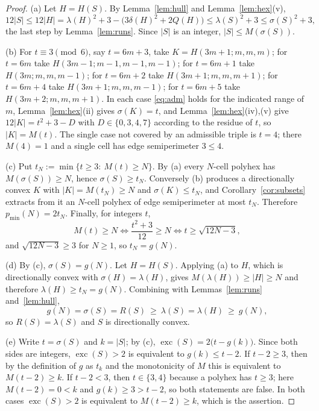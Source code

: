 \documentclass[11pt]{article}
\theoremstyle{plain}
\theoremstyle{definition}
\theoremstyle{remark}
\DeclareMathOperator{\exc}{exc}
\begin{document}
\begin{proof}
(a) Let \(H=H(S)\). By Lemma~\ref{lem:hull} and Lemma~\ref{lem:hex}(v),
\[
   12|S|\le12|H|=\lambda(H)^{2}+3-\bigl(3\delta(H)^{2}+2Q(H)\bigr)\le\lambda(S)^{2}+3
   \le\sigma(S)^{2}+3 ,
\]
the last step by Lemma~\ref{lem:runs}. Since \(|S|\) is an integer, \(|S|\le M(\sigma(S))\).

(b) For \(t\equiv3\pmod 6\), say \(t=6m+3\), take \(K=H(3m+1;m,m,m)\); for \(t=6m\) take
\(H(3m-1;m-1,m-1,m-1)\); for \(t=6m+1\) take \(H(3m;m,m,m-1)\); for \(t=6m+2\) take
\(H(3m+1;m,m,m+1)\); for \(t=6m+4\) take \(H(3m+1;m,m,m-1)\); for \(t=6m+5\) take
\(H(3m+2;m,m,m+1)\). In each case \eqref{eq:adm} holds for the indicated range of \(m\),
Lemma~\ref{lem:hex}(ii) gives \(\sigma(K)=t\), and Lemma~\ref{lem:hex}(iv),(v) give
\(12|K|=t^{2}+3-D\) with \(D\in\{0,3,4,7\}\) according to the residue of \(t\), so
\(|K|=M(t)\). The single case not covered by an admissible triple is \(t=4\); there
\(M(4)=1\) and a single cell has edge semiperimeter \(3\le4\).

(c) Put \(t_{N}:=\min\{t\ge3:\ M(t)\ge N\}\). By (a) every \(N\)-cell polyhex has
\(M(\sigma(S))\ge N\), hence \(\sigma(S)\ge t_{N}\). Conversely (b) produces a
directionally convex \(K\) with \(|K|=M(t_{N})\ge N\) and \(\sigma(K)\le t_{N}\), and
Corollary~\ref{cor:subsets} extracts from it an \(N\)-cell polyhex of edge semiperimeter at
most \(t_{N}\). Therefore \(p_{\min}(N)=2t_{N}\). Finally, for integers \(t\),
\[
   M(t)\ge N\iff \frac{t^{2}+3}{12}\ge N\iff t\ge\sqrt{12N-3},
\]
and \(\sqrt{12N-3}\ge3\) for \(N\ge1\), so \(t_{N}=g(N)\).

(d) By (c), \(\sigma(S)=g(N)\). Let \(H=H(S)\). Applying (a) to \(H\), which is
directionally convex with \(\sigma(H)=\lambda(H)\), gives \(M(\lambda(H))\ge|H|\ge N\) and
therefore \(\lambda(H)\ge t_{N}=g(N)\). Combining with Lemmas~\ref{lem:runs}
and~\ref{lem:hull},
\[
   g(N)=\sigma(S)=R(S)\ \ge\ \lambda(S)=\lambda(H)\ \ge\ g(N),
\]
so \(R(S)=\lambda(S)\) and \(S\) is directionally convex.

(e) Write \(t=\sigma(S)\) and \(k=|S|\); by (c), \(\exc(S)=2\bigl(t-g(k)\bigr)\). Since
both sides are integers, \(\exc(S)>2\) is equivalent to \(g(k)\le t-2\). If \(t-2\ge3\),
then by the definition of \(g\) as \(t_{k}\) and the monotonicity of \(M\) this is
equivalent to \(M(t-2)\ge k\). If \(t-2<3\), then \(t\in\{3,4\}\) because a polyhex has
\(t\ge3\); here \(M(t-2)=0<k\) and \(g(k)\ge3>t-2\), so both statements are false.
In both cases \(\exc(S)>2\) is equivalent to \(M(t-2)\ge k\), which is the assertion.
\end{proof}
\end{document}
